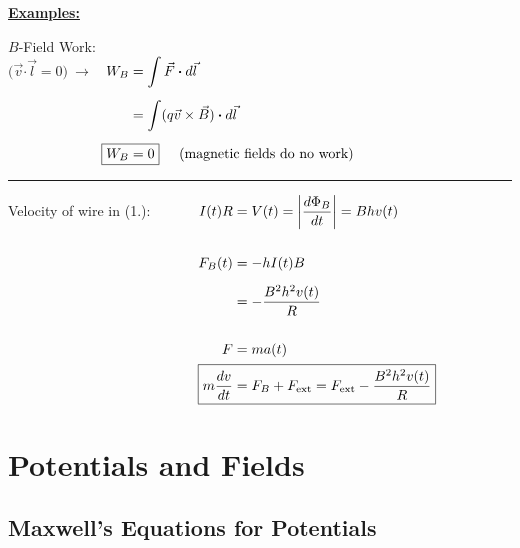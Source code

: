 \documentclass[12pt]{article}
\newcommand{\dotP}{\boldsymbol \cdot}		%
\begin{document}
\vspace{15pt}\noindent 
\textbf{\underline{Examples:}}\\[15pt]
\noindent
\begin{minipage}[t]{.46\textwidth}
		\(B\)-Field Work:\\[5pt]
		\( \big( \vec{v} \dotP \vec{l} = 0 \big) \ \rightarrow \ \) 
		\( \begin{aligned}[t]
			W_B &= \int \vec{F} \dotP d\vec{l} \\[5pt]
			&= \int ( q \vec{v} \times \vec{B} ) \dotP d\vec{l} \\[5pt]
			\Aboxed{ W_B &= 0 } \hspace{.5cm} \text{(magnetic fields do no work)}
		\end{aligned} \)	
	\end{minipage}
	\rule[-165pt]{.5pt}{185pt}
	\hspace{20pt}
	\begin{minipage}[t]{.49\textwidth}
		Velocity of wire in (1.): \ \ \ \ \ \
		\( \begin{aligned}[t]
			I(t) R &= V(t) = \left| \frac{d \Phi_B}{dt} \right| = B h v(t) \\[15pt]
			F_B(t) &= - h I(t) B \\[5pt]
			&= - \frac{B^2 h^2 v(t)}{R} \\[15pt]
			F &= m a(t) \\
			\Aboxed{ m \frac{dv}{dt} &= F_B + F_\text{ext} = F_\text{ext} - \frac{B^2 h^2 v(t)}{R} }
		\end{aligned} \)
\end{minipage}

\newpage
\section{Potentials and Fields}
\subsection{Maxwell's Equations for Potentials}
\end{document}

